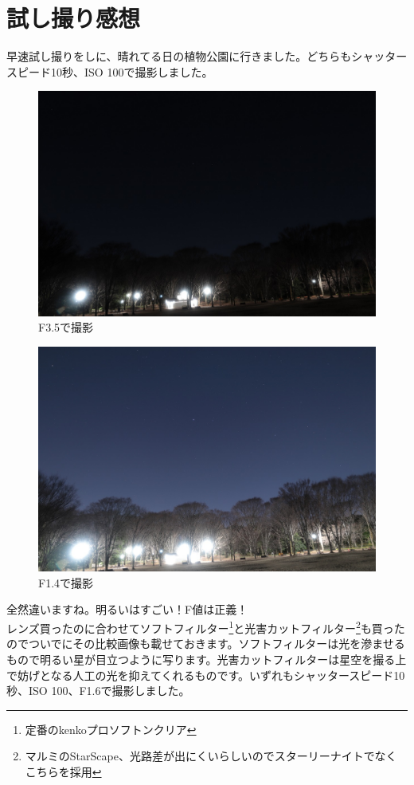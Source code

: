 \documentclass[a4paper.10pt]{jarticle}
\begin{document}
\section{試し撮り感想}
早速試し撮りをしに、晴れてる日の植物公園に行きました。どちらもシャッタースピード10秒、ISO 100で撮影しました。
\begin{figure}[H]
\begin{center}
  \includegraphics[width=12cm]{kurai.jpg}
\caption{F3.5で撮影}
\label{}
\end{center}
\end{figure}
\begin{figure}[H]
\begin{center}
  \includegraphics[width=12cm]{akarui.jpg}
\caption{F1.4で撮影}
\label{}
\end{center}
\end{figure}
全然違いますね。明るいはすごい！F値は正義！\\
レンズ買ったのに合わせてソフトフィルター\footnote{定番のkenkoプロソフトンクリア}と光害カットフィルター\footnote{マルミのStarScape、光路差が出にくいらしいのでスターリーナイトでなくこちらを採用}も買ったのでついでにその比較画像も載せておきます。ソフトフィルターは光を滲ませるもので明るい星が目立つように写ります。光害カットフィルターは星空を撮る上で妨げとなる人工の光を抑えてくれるものです。いずれもシャッタースピード10秒、ISO 100、F1.6で撮影しました。
\end{document}
